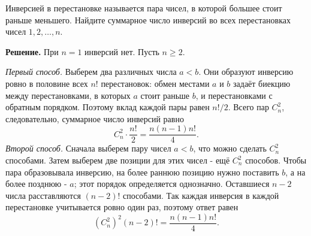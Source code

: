 \begin{problems}
\item Инверсией в перестановке называется пара чисел, в которой большее стоит раньше меньшего. Найдите суммарное число инверсий во всех перестановках чисел $1,2,\ldots,n$.
\par\smallskip\noindent\textbf{Решение.} При $n=1$ инверсий нет. Пусть $n\ge2$.
\par\textit{Первый способ.} Выберем два различных числа $a<b$. Они образуют инверсию ровно в половине всех $n!$ перестановок: обмен местами $a$ и $b$ задаёт биекцию между перестановками, в которых $a$ стоит раньше $b$, и перестановками с обратным порядком. Поэтому вклад каждой пары равен $n!/2$. Всего пар $C_n^2$, следовательно, суммарное число инверсий равно
\[
C_n^2\cdot\frac{n!}{2}=\frac{n(n-1)n!}{4}.
\]
\textit{Второй способ.} Сначала выберем пару чисел $a<b$, что можно сделать $C_n^2$ способами. Затем выберем две позиции для этих чисел - ещё $C_n^2$ способов. Чтобы пара образовывала инверсию, на более раннюю позицию нужно поставить $b$, а на более позднюю - $a$; этот порядок определяется однозначно. Оставшиеся $n-2$ числа расставляются $(n-2)!$ способами. Так каждая инверсия в каждой перестановке учитывается ровно один раз, поэтому ответ равен
\[
\left(C_n^2\right)^2(n-2)!=\frac{n(n-1)n!}{4}.
\]\par

\end{problems}

